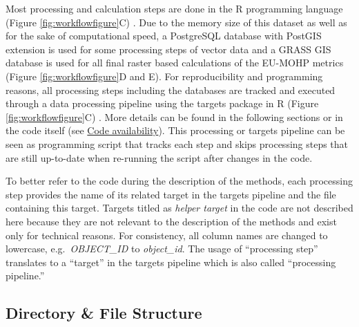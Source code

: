 \documentclass[fleqn,10pt]{wlscirep}
\begin{document}
Most processing and calculation steps are done in the R programming language (Figure \ref{fig:workflowfigure}C) \cite{r_core_team_r_2020}. Due to the memory size of this dataset as well as for the sake of computational speed, a PostgreSQL database with PostGIS extension is used for some processing steps of vector data and a GRASS GIS database is used for all final raster based calculations of the EU-MOHP\cite{nolscher_eu-mohp_2021-1} metrics (Figure \ref{fig:workflowfigure}D and E). For reproducibility and programming reasons, all processing steps including the databases are tracked and executed through a data processing pipeline using the targets package in R (Figure \ref{fig:workflowfigure}C) \cite{landau_targets_2021}. More details can be found in the following sections or in the code itself (see \protect\hyperlink{code-availability}{Code availability}). This processing or targets pipeline can be seen as programming script that tracks each step and skips processing steps that are still up-to-date when re-running the script after changes in the code.

To better refer to the code during the description of the methods, each processing step provides the name of its related target in the targets pipeline and the file containing this target. Targets titled as \emph{helper target} in the code are not described here because they are not relevant to the description of the methods and exist only for technical reasons. For consistency, all column names are changed to lowercase, e.g.~\emph{OBJECT\_ID} to \emph{object\_id}. The usage of ``processing step'' translates to a ``target'' in the targets pipeline which is also called ``processing pipeline.''

\hypertarget{directory-file-structure}{%
\subsection*{Directory \& File Structure}\label{directory-file-structure}}
\end{document}
